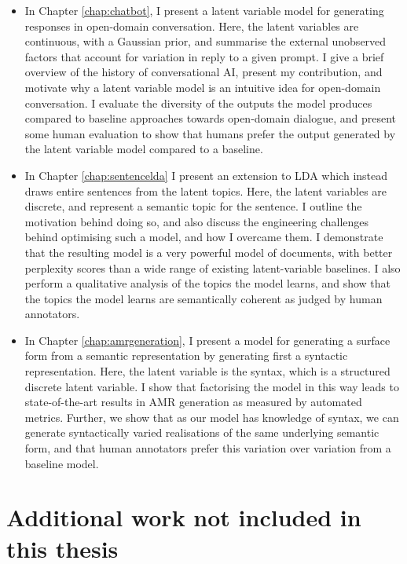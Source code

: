 \begin{itemize}
    \item In Chapter \ref{chap:chatbot}, I present a latent variable model for generating responses in open-domain conversation. Here, the latent variables are continuous, with a Gaussian prior, and summarise the external unobserved factors that account for variation in reply to a given prompt. I give a brief overview of the history of conversational AI, present my contribution, and motivate why a latent variable model is an intuitive idea for open-domain conversation. I evaluate the diversity of the outputs the model produces compared to baseline approaches towards open-domain dialogue, and present some human evaluation to show that humans prefer the output generated by the latent variable model compared to a baseline.
    
    \item In Chapter \ref{chap:sentencelda} I present an extension to LDA which instead draws entire sentences from the latent topics. Here, the latent variables are discrete, and represent a semantic topic for the sentence. I outline the motivation behind doing so, and also discuss the engineering challenges behind optimising such a model, and how I overcame them. I demonstrate that the resulting model is a very powerful model of documents, with better perplexity scores than a wide range of existing latent-variable baselines. I also perform a qualitative analysis of the topics the model learns, and show that the topics the model learns are semantically coherent as judged by human annotators.
    
    \item In Chapter \ref{chap:amrgeneration}, I present a model for generating a surface form from a semantic representation by generating first a syntactic representation. Here, the latent variable is the syntax, which is a structured discrete latent variable. I show that factorising the model in this way leads to state-of-the-art results in AMR generation as measured by automated metrics. Further, we show that as our model has knowledge of syntax, we can generate syntactically varied realisations of the same underlying semantic form, and that human annotators prefer this variation over variation from a baseline model.
\end{itemize}

\section{Additional work not included in this thesis}

